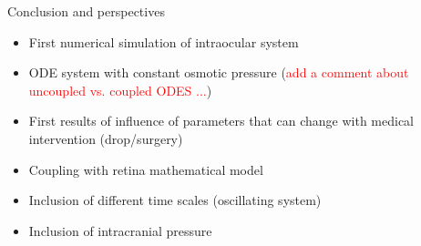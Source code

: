 \begin{frame}{Conclusion and perspectives}
\begin{itemize}
\item First numerical simulation of intraocular system
\item ODE system with constant osmotic pressure (\textcolor{red}{add a comment about uncoupled vs. coupled ODES ...})
\item First results of influence of parameters that can change with medical intervention (drop/surgery)
\end{itemize}

\begin{itemize}
\item Coupling with retina mathematical model
\item Inclusion of different time scales (oscillating system)
\item Inclusion of intracranial pressure
\end{itemize}
\end{frame}
